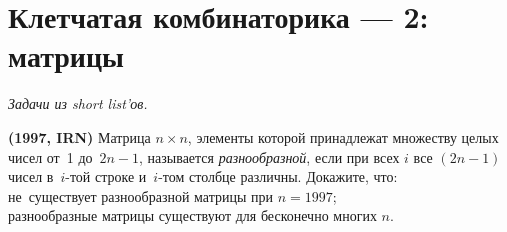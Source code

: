 
\section*{Клетчатая комбинаторика --- 2: матрицы}


\begingroup
\providecommand\ifincludesolutions{\iffalse}


\emph{Задачи из short list'ов.}

\ifincludesolutions
\textbf{Версия с решениями.}
\emph{Решения являются слабообработанным переводом с~английского.
Beware!}
\fi

\begin{problems}

\item\textbf{(1997, IRN)}
Матрица $n \times n$, элементы которой принадлежат множеству целых чисел
от~1 до~$2 n - 1$, называется \emph{разнообразной}, если при всех
$i$ все $(2 n - 1)$ чисел в~$i$-той строке и~$i$-том столбце различны.
Докажите, что:
\\
\sp
не~существует разнообразной матрицы при $n = 1997$;
\\
\sp
разнообразные матрицы существуют для бесконечно многих $n$.

\end{problems}

